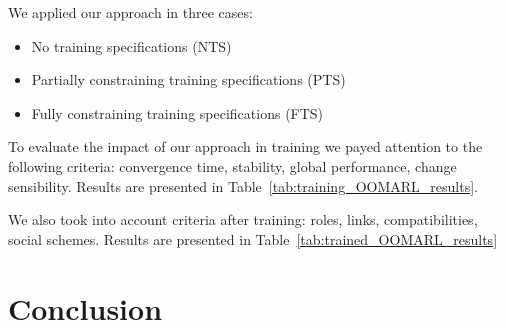 \documentclass[runningheads]{llncs}
\begin{document}

We applied our approach in three cases:
\begin{itemize}
    \item No training specifications (NTS)
    \item Partially constraining training specifications (PTS)
    \item Fully constraining training specifications (FTS)
\end{itemize}

To evaluate the impact of our approach in training we payed attention to the following criteria: convergence time, stability, global performance, change sensibility. Results are presented in Table~\ref{tab:training_OOMARL_results}.



We also took into account criteria after training: roles, links, compatibilities, social schemes. Results are presented in Table~\ref{tab:trained_OOMARL_results}



\section{Conclusion}


\end{document}
